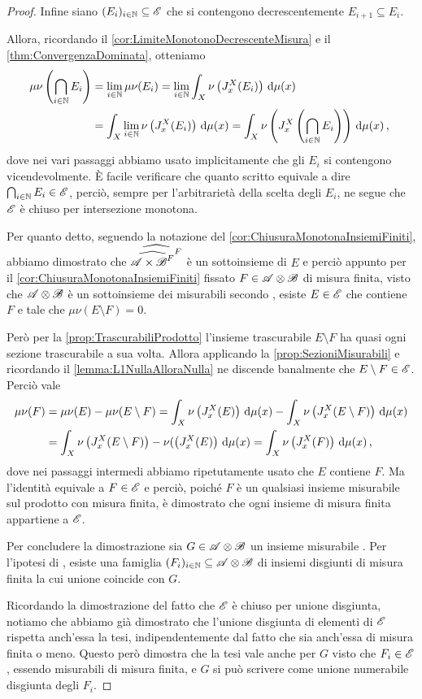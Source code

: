 \begin{proof}
	Infine siano $(E_i)_{i\in\mathbb N}\subseteq \mathscr E$ che si contengono decrescentemente $E_{i+1}\subseteq E_i$.
	
	Allora, ricordando il \cref{cor:LimiteMonotonoDecrescenteMisura} e il \cref{thm:ConvergenzaDominata}, otteniamo
	\begin{align*}
		\mu\nu\left(\bigcap_{i\in\mathbb N}E_i\right)&=\lim_{i\in\mathbb N}\mu\nu(E_i)=
		\lim_{i\in\mathbb N}\int_X\nu\left(J_x^X(E_i)\right)\,\mathrm d\mu(x)\\
		&=\int_X\lim_{i\in\mathbb N}\nu\left(J_x^X(E_i)\right)\,\mathrm d\mu(x)=
		\int_X\nu\left(J_x^X\left(\bigcap_{i\in\mathbb N}E_i\right)\right)\,\mathrm d\mu(x)\, \text{, }
	\end{align*}
	dove nei vari passaggi abbiamo usato implicitamente che gli $E_i$ si contengono vicendevolmente.
	È facile verificare che quanto scritto equivale a dire $\bigcap_{i\in\mathbb N}E_i\in\mathscr E$, perciò, sempre per l'arbitrarietà della scelta degli $E_i$, ne segue che $\mathscr E$ è chiuso per intersezione monotona.
	
	Per quanto detto, seguendo la notazione del \cref{cor:ChiusuraMonotonaInsiemiFiniti}, abbiamo dimostrato che $\widehat{\widehat{{\mathscr A\times\mathscr B}^F}^F}$ è un sottoinsieme di $E$ e perciò appunto per il \cref{cor:ChiusuraMonotonaInsiemiFiniti} fissato $F\in\mathscr A\otimes\mathscr B$ di misura finita, visto che $\mathscr A\otimes\mathscr B$ è un sottoinsieme dei misurabili secondo \carat{}, esiste $E\in\mathscr E$ che contiene $F$ e tale che $\mu\nu(E\setminus F)=0$. 
	
	Però per la \cref{prop:TrascurabiliProdotto} l'insieme trascurabile $E\setminus F$ ha quasi ogni sezione trascurabile a sua volta.
	Allora applicando la \cref{prop:SezioniMisurabili} e ricordando il \cref{lemma:L1NullaAlloraNulla} ne discende banalmente che $E\setminus F\in\mathscr E$.
	Perciò vale
	\begin{align*}
		\mu\nu(F)&=\mu\nu(E)-\mu\nu(E\setminus F)=\int_X\nu\left(J_x^X(E)\right)\,\mathrm d\mu(x)-\int_X\nu\left(J_x^X(E\setminus F)\right)\,\mathrm d\mu(x)\\
		&=\int_X\nu\left(J_x^X(E\setminus F)\right)-\nu(\left(J_x^X(E)\right)\,\mathrm d\mu(x)
		=\int_X\nu\left(J_x^X(F)\right)\,\mathrm d\mu(x)\, \text{, }
	\end{align*}
	dove nei passaggi intermedi abbiamo ripetutamente usato che $E$ contiene $F$.
	Ma l'identità equivale a $F\in\mathscr E$ e perciò, poiché $F$ è un qualsiasi insieme misurabile sul prodotto con misura finita, è dimostrato che ogni insieme di misura finita appartiene a $\mathscr E$.
	
	Per concludere la dimostrazione sia $G\in\mathscr A\otimes\mathscr B$ un insieme misurabile \sigfin[o]. Per l'ipotesi di \sigfin[ezza], esiste una famiglia $(F_i)_{i\in\mathbb N}\subseteq \mathscr A\otimes\mathscr B$ di insiemi disgiunti di misura finita la cui unione coincide con $G$.
	
	Ricordando la dimostrazione del fatto che $\mathscr E$ è chiuso per unione disgiunta, notiamo che abbiamo già dimostrato che l'unione disgiunta di elementi di $\mathscr E$ rispetta anch'essa la tesi, indipendentemente dal fatto che sia anch'essa di misura finita o meno. Questo però dimostra che la tesi vale anche per $G$ visto che $F_i\in\mathscr E$, essendo misurabili di misura finita, e $G$ si può scrivere come unione numerabile disgiunta degli $F_i$. 
\end{proof}

